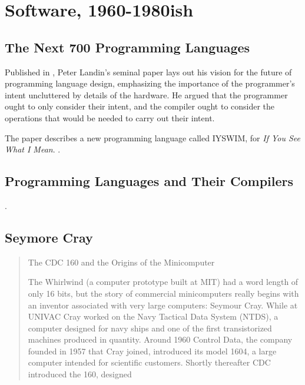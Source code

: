 
\chapter{Software, 1960-1980ish}
\label{chap:software}





\section{The Next 700 Programming Languages}

Published in \citeyear{landin_next_700_prog_langs_1966},
Peter Landin's seminal paper  lays out his vision for
the future of programming language design, emphasizing the importance of the programmer's intent
uncluttered by details of the hardware.
He argued that the programmer ought to only consider their intent, and the compiler ought to
consider the operations that would be needed to carry out their intent.

The paper describes a new programming language called IYSWIM, for \textit{If You See What I Mean}.
.

\section{Programming Languages and Their Compilers}

.

\section{Seymore Cray}
\begin{quotation}
	The CDC 160 and the Origins of the Minicomputer

	The Whirlwind (a computer prototype built at
	MIT) had a word length of only 16 bits, but the story of commercial minicomputers really begins with
	an inventor associated with very large computers: Seymour Cray. While at UNIVAC Cray worked on the
	Navy Tactical Data System (NTDS), a computer designed for navy ships and one of the first
	transistorized machines produced in quantity. Around 1960 Control Data, the company founded in 1957
	that Cray joined, introduced its model 1604, a large computer intended for scientific customers.
	Shortly thereafter CDC introduced the 160, designed
	\cite{nothing_new_since_von_neumann_2000}
\end{quotation}

